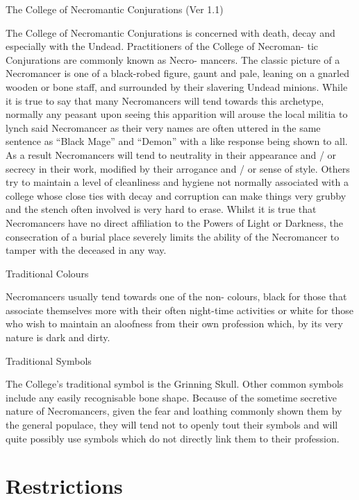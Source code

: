 \begin{Chapter}{The College of Necromantic Conjurations (Ver 1.1)}

The College of Necromantic Conjurations is concerned with death, decay
and especially with the Undead. Practitioners of the College of
Necroman- tic Conjurations are commonly known as Necro- mancers.  The
classic picture of a Necromancer is one of a black-robed figure, gaunt
and pale, leaning on a gnarled wooden or bone staff, and surrounded by
their slavering Undead minions. While it is true to say that many
Necromancers will tend towards this archetype, normally any peasant
upon seeing this apparition will arouse the local militia to lynch
said Necromancer as their very names are often uttered in the same
sentence as “Black Mage” and “Demon” with a like response being shown
to all.  As a result Necromancers will tend to neutrality in their
appearance and / or secrecy in their work, modified by their arrogance
and / or sense of style.  Others try to maintain a level of
cleanliness and hygiene not normally associated with a college whose
close ties with decay and corruption can make things very grubby and
the stench often involved is very hard to erase. Whilst it is true
that Necromancers have no direct affiliation to the Powers of Light or
Darkness, the consecration of a burial place severely limits the
ability of the Necromancer to tamper with the deceased in any way.

Traditional Colours 

Necromancers usually tend towards one of the non-
colours,  black  for  those  that  associate  themselves 
more with their often night-time activities or white 
for  those  who  wish  to  maintain  an  aloofness  from 
their  own  profession  which,  by  its  very  nature  is 
dark and dirty. 

Traditional Symbols 

The  College’s  traditional  symbol  is  the  Grinning 
Skull.  Other  common  symbols  include  any  easily 
recognisable bone shape. Because of the sometime 
secretive  nature  of  Necromancers,  given  the  fear 
and loathing commonly shown them by the general 
populace,  they  will  tend  not  to  openly  tout  their 
symbols and will quite possibly use symbols which 
do not directly link them to their profession. 

\section{Restrictions}


\end{Chapter}
